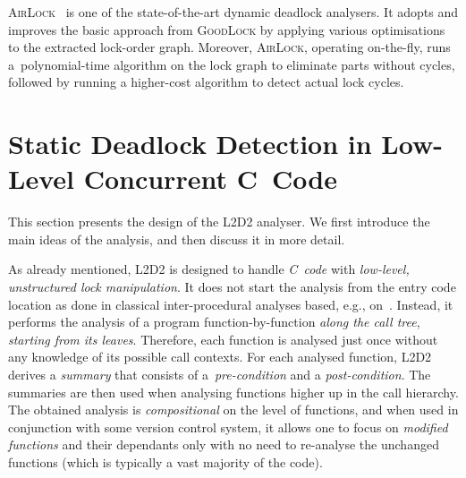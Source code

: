 \documentclass[runningheads]{llncs}
\newcommand{\LLDD}{\textsc{L2D2}\xspace} %
\newcommand{\Infer}{\textsc{Infer}\xspace}
\newcommand{\GoodLock}{\textsc{GoodLock}\xspace}
\newcommand{\AirLock}{\textsc{AirLock}\xspace}
\begin{document}
\AirLock~\cite{airlock20} is one of the state-of-the-art dynamic deadlock
analysers. It adopts and improves the basic approach from \GoodLock by applying
various optimisations to the extracted lock-order graph. Moreover, \AirLock,
operating on-the-fly, runs a~polynomial-time algorithm on the lock graph to
eliminate parts without cycles, followed by running a higher-cost algorithm to
detect actual lock cycles.

\vspace*{-3mm}\section{Static Deadlock Detection in Low-Level Concurrent
C~Code}\vspace*{-2mm} \label{sec:l2d2}

This section presents the design of the \LLDD analyser. We first introduce the
main ideas of the analysis, and then discuss it in more detail.

\enlargethispage{6mm}

As already mentioned, \LLDD is designed to handle \emph{C~code} with
\emph{low-level, unstructured lock manipulation}. It does not start the analysis
from the entry code location as done in classical inter-procedural analyses
based, e.g., on~\cite{dfagr95}. Instead, it performs the analysis of a program
function-by-function \emph{along the call tree}, \emph{starting from its
leaves}.
%
%
Therefore, each function is analysed just once without any knowledge of its
possible call contexts. For each analysed function, \LLDD derives a
\emph{summary} that consists of a~\emph{pre-condition} and a
\emph{post-condition}. The summaries are then used when analysing functions
higher up in the call hierarchy. The obtained analysis is \emph{compositional}
on the level of functions, and when used in conjunction with some version
control system, it allows one to focus on \emph{modified functions} and their
dependants only with no need to re-analyse the unchanged functions (which is
typically a vast majority of the code).
%
\end{document}
